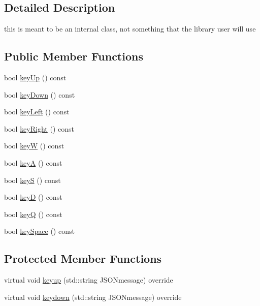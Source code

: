 \subsection{Detailed Description}
this is meant to be an internal class, not something that the library user will use \subsection*{Public Member Functions}
\begin{DoxyCompactItemize}
\item 
bool \mbox{\hyperlink{classbridges_1_1game_1_1_input_helper_aaa62faebd9e874228b710bb2a57cba2b}{key\+Up}} () const
\item 
bool \mbox{\hyperlink{classbridges_1_1game_1_1_input_helper_a904f5f5d2c6408bcd447044555cd376d}{key\+Down}} () const
\item 
bool \mbox{\hyperlink{classbridges_1_1game_1_1_input_helper_a9e98e137e69ef8b2f92e587092c42af4}{key\+Left}} () const
\item 
bool \mbox{\hyperlink{classbridges_1_1game_1_1_input_helper_a265fb9bd88d66e5439dd791bb90c79a4}{key\+Right}} () const
\item 
bool \mbox{\hyperlink{classbridges_1_1game_1_1_input_helper_a97a204c00019b28b4e95dde0b757a1aa}{keyW}} () const
\item 
bool \mbox{\hyperlink{classbridges_1_1game_1_1_input_helper_a168770e762b33e32597f9f7294082d9b}{keyA}} () const
\item 
bool \mbox{\hyperlink{classbridges_1_1game_1_1_input_helper_aa141b96b3406e66feab876185c7f350e}{keyS}} () const
\item 
bool \mbox{\hyperlink{classbridges_1_1game_1_1_input_helper_af7247d84254d706e3a309db2f4c20e9b}{keyD}} () const
\item 
bool \mbox{\hyperlink{classbridges_1_1game_1_1_input_helper_acef5fda1a5679e811fdf5a669dc65f9f}{keyQ}} () const
\item 
bool \mbox{\hyperlink{classbridges_1_1game_1_1_input_helper_a1750cd9c59e18126c251ec468fc87d48}{key\+Space}} () const
\end{DoxyCompactItemize}
\subsection*{Protected Member Functions}
\begin{DoxyCompactItemize}
\item 
virtual void \mbox{\hyperlink{classbridges_1_1game_1_1_input_helper_aa847f19c6f68ebbb63d73802abfcd9a0}{keyup}} (std\+::string J\+S\+O\+Nmessage) override
\item 
virtual void \mbox{\hyperlink{classbridges_1_1game_1_1_input_helper_aac75c2b1abf28afa4acaf730e925f301}{keydown}} (std\+::string J\+S\+O\+Nmessage) override
\end{DoxyCompactItemize}


